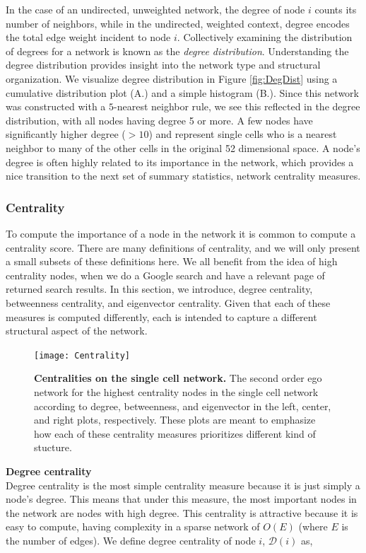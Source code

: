 In the case of an undirected, unweighted network, the degree of node $i$ counts its number of neighbors, while in the undirected, weighted context, degree encodes the total edge weight incident to node $i$. Collectively examining the distribution of degrees for a network is known as the \emph{degree distribution}. Understanding the degree distribution provides insight into the network type and structural organization.  We visualize degree distribution in Figure \ref{fig:DegDist} using a cumulative distribution plot (A.) and a simple histogram (B.). Since this network was constructed with a $5$-nearest neighbor rule, we see this reflected in the degree distribution, with all nodes having degree 5 or more. A few nodes have significantly higher degree ($> 10$) and represent single cells who is a nearest neighbor to many of the other cells in the original 52 dimensional space. A node's degree is often highly related to its importance in the network, which provides a nice transition to the next set of summary statistics, network centrality measures.

\subsubsection{Centrality}
\indent To compute the importance of a node in the network it is common to compute a centrality score. There are many definitions of centrality, and we will only present a small subsets of these definitions here. We all benefit from the idea of high centrality nodes, when we do a Google search and have a relevant page of returned search results. In this section, we introduce, degree centrality, betweenness centrality, and eigenvector centrality. Given that each of these measures is computed differently, each is intended to capture a different structural aspect of the network. 

 \begin{figure}[h!]
\begin{center}
\texttt{[image: Centrality]}
\caption{{\bf Centralities on the single cell network.} The second order ego network for the highest centrality nodes in the single cell network according to degree, betweenness, and eigenvector in the left, center, and right plots, respectively. These plots are meant to emphasize how each of these centrality measures prioritizes different kind of stucture.}
\label{fig:Centrality}
\end{center}
\end{figure}

{\bf Degree centrality}\\
Degree centrality is the most simple centrality measure because it is just simply a node's degree. This means that under this measure, the most important nodes in the network are nodes with high degree. This centrality is attractive because it is easy to compute, having complexity in a sparse network of $O(E)$ (where $E$ is the number of edges). We define degree centrality of node $i$, $\mathcal{D}(i)$ as,

